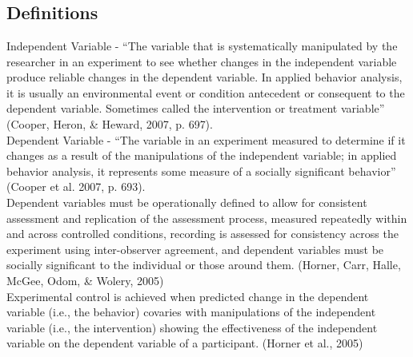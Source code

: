 \clearpage \section[\fourbThree{}]{\fourbThree{}%
              }
              
              

\subsection{Definitions} 
Independent Variable - ``The variable that is systematically manipulated by the researcher in an experiment to see whether changes in the independent variable produce reliable changes in the dependent variable. In applied behavior analysis, it is usually an environmental event or condition antecedent or consequent to the dependent variable. Sometimes called the intervention or treatment variable'' (Cooper, Heron, \& Heward, 2007, p. 697).\\

Dependent Variable - ``The variable in an experiment measured to determine if it changes as a result of the manipulations of the independent variable; in applied behavior analysis, it represents some measure of a socially significant behavior'' (Cooper et al. 2007, p. 693).\\

Dependent variables must be operationally defined to allow for consistent assessment and replication of the assessment process, measured repeatedly within and across controlled conditions, recording is assessed for consistency across the experiment using inter-observer agreement, and dependent variables must be socially significant to the individual or those around them. (Horner, Carr, Halle, McGee, Odom, \& Wolery, 2005)\\

Experimental control is achieved when predicted change in the dependent variable (i.e., the behavior) covaries with manipulations of the independent variable (i.e., the intervention) showing the effectiveness of the independent variable on the dependent variable of a participant. (Horner et al., 2005)
%
